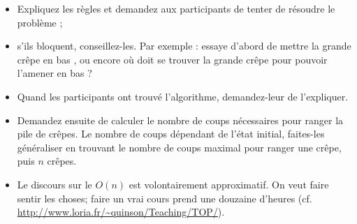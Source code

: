 \begin{itemize}
\item Expliquez les règles et demandez aux participants de tenter de résoudre le
  problème ;
\item s'ils bloquent, conseillez-les. Par exemple : \og essaye d'abord de mettre
  la grande crêpe en bas \fg, ou encore \og où doit se trouver la grande crêpe
  pour pouvoir l'amener en bas ? \fg
\item Quand les participants ont trouvé l'algorithme, demandez-leur de
  l'expliquer.
\item Demandez ensuite de calculer le nombre de coups nécessaires pour ranger la
  pile de crêpes. Le nombre de coups dépendant de l'état initial, faites-les
  généraliser en trouvant le nombre de coups maximal pour ranger une crêpe, puis
  $n$ crêpes.
\item Le discours sur le $O(n)$ est volontairement approximatif. On veut faire
  sentir les choses; faire un vrai cours prend une douzaine d'heures
  (cf. \url{http://www.loria.fr/~quinson/Teaching/TOP/}).
\end{itemize}


